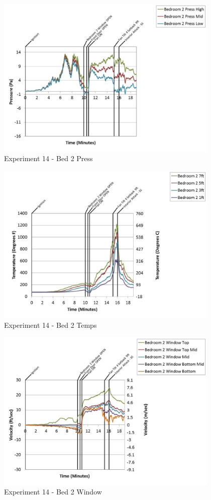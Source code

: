 \documentclass{article}
\begin{document}
\begin{appendices}
	\begin{figure}[h!]
		\centering
		\includegraphics[height=3.05in]{0_Images/Results_Charts/Exp_14_Charts/Bed2Press.pdf}
		\caption{Experiment 14 - Bed 2 Press}
	\end{figure}
 
	\clearpage

	\begin{figure}[h!]
		\centering
		\includegraphics[height=3.05in]{0_Images/Results_Charts/Exp_14_Charts/Bed2Temps.pdf}
		\caption{Experiment 14 - Bed 2 Temps}
	\end{figure}
 

	\begin{figure}[h!]
		\centering
		\includegraphics[height=3.05in]{0_Images/Results_Charts/Exp_14_Charts/Bed2Window.pdf}
		\caption{Experiment 14 - Bed 2 Window}
	\end{figure}
 

\end{appendices}
\end{document}

